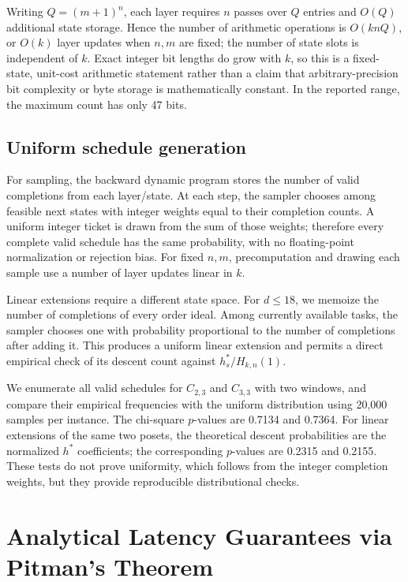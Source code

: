\documentclass[10pt]{article}
\begin{document}
Writing $Q=(m+1)^n$, each layer requires $n$ passes over $Q$ entries and $O(Q)$ additional state storage. Hence the number of arithmetic operations is $O(knQ)$, or $O(k)$ layer updates when $n,m$ are fixed; the number of state slots is independent of $k$. Exact integer bit lengths do grow with $k$, so this is a fixed-state, unit-cost arithmetic statement rather than a claim that arbitrary-precision bit complexity or byte storage is mathematically constant. In the reported range, the maximum count has only 47 bits.

\subsection{Uniform schedule generation}

For sampling, the backward dynamic program stores the number of valid completions from each layer/state. At each step, the sampler chooses among feasible next states with integer weights equal to their completion counts. A uniform integer ticket is drawn from the sum of those weights; therefore every complete valid schedule has the same probability, with no floating-point normalization or rejection bias. For fixed $n,m$, precomputation and drawing each sample use a number of layer updates linear in $k$.

Linear extensions require a different state space. For $d\le18$, we memoize the number of completions of every order ideal. Among currently available tasks, the sampler chooses one with probability proportional to the number of completions after adding it. This produces a uniform linear extension and permits a direct empirical check of its descent count against $h_s^*/H_{k,n}(1)$.

We enumerate all valid schedules for $C_{2,3}$ and $C_{3,3}$ with two windows, and compare their empirical frequencies with the uniform distribution using 20,000 samples per instance. The chi-square $p$-values are 0.7134 and 0.7364. For linear extensions of the same two posets, the theoretical descent probabilities are the normalized $h^*$ coefficients; the corresponding $p$-values are 0.2315 and 0.2155. These tests do not prove uniformity, which follows from the integer completion weights, but they provide reproducible distributional checks.

\section{Analytical Latency Guarantees via Pitman's Theorem}
\end{document}
